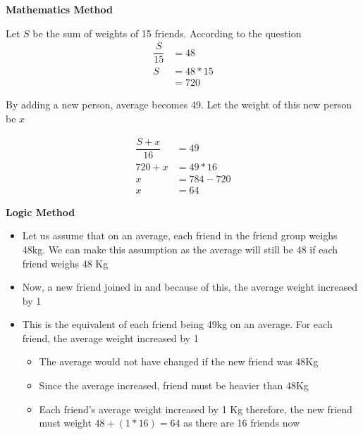 \begin{multicols}{2}

    \textbf{Mathematics Method}

    Let $S$ be the sum of weights of 15 friends. According to the question 
    \begin{align*}
        \dfrac{S}{15} &= 48 \\
        S &= 48 * 15 \\
        &= 720
    \end{align*}
    
    By adding a new person, average becomes 49. Let the weight of this new person be $x$
    
    \begin{align*}
        \dfrac{S + x}{16} &= 49 \\
        720 + x &= 49 * 16 \\
        x &= 784 - 720 \\
        x &= 64
    \end{align*}
    

    \columnbreak

    \textbf{Logic Method}

    \begin{itemize}
        \item Let us assume that on an average, each friend in the friend group weighs 48kg. We can make this assumption as the average will still be 48 if each friend weighs 48 Kg
        \item Now, a new friend joined in and because of this, the average weight increased by 1
        \item This is the equivalent of each friend being 49kg on an average. For each friend, the average weight increased by 1
        \begin{itemize}
            \item The average would not have changed if the new friend was 48Kg
            \item Since the average increased, friend must be heavier than 48Kg
            \item Each friend's average weight increased by 1 Kg therefore, the new friend must weight $48 + (1 * 16) = 64$ as there are 16 friends now
        \end{itemize}
    \end{itemize}

\end{multicols}


